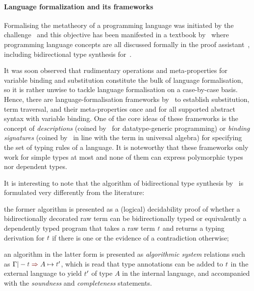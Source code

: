 \paragraph{Language formalization and its frameworks}
Formalising the metatheory of a programming language was initiated by the \PoplMark challenge~\citep{Aydemir2005} and this objective has been manifested in a textbook by~\citet{Wadler2022} where programming language concepts are all discussed formally in the proof assistant~\Agda, including bidirectional type synthesis for~\PCF.

It was soon observed that rudimentary operations and meta-properties for variable binding and substitution constitute the bulk of language formalisation, so it is rather unwise to tackle language formalisation on a case-by-case basis.
Hence, there are language-formalisation frameworks by~\citet{Ahrens2018,Fiore2022,Gheri2020,Ahrens2022,Allais2021} to establish substitution, term traversal, and their meta-properties once and for all supported abstract syntax with variable binding.
One of the core ideas of these frameworks is the concept of \emph{descriptions} (coined by~\citet{Chapman2010} for datatype-generic programming) or \emph{binding signatures} (coined by~\citet{Aczel1978} in line with the term in universal algebra) for specifying the set of typing rules of a language.
It is noteworthy that these frameworks only work for simple types at most and none of them can express polymorphic types nor dependent types.

\begin{remark}\label{re:type-synthesis-as-decidability-proof}
It is interesting to note that the algorithm of bidirectional type synthesis by~\citeauthor{Wadler2022} is formulated very differently from the literature:
\begin{enumerate*}
  \item the former algorithm is presented as a (logical) decidability proof of whether a bidirectionally decorated raw term can be bidirectionally typed or equivalently a dependently typed program that takes a raw term $\isTerm{t}$ and returns a typing derivation for $\isTerm{t}$ if there is one or the evidence of a contradiction otherwise;

  \item an algorithm in the latter form is presented as \emph{algorithmic system} relations such as $\Gamma |- \isTerm{t} \syn A \mapsto \isTerm{t}'$, which is read that type annotations can be added to $\isTerm{t}$ in the external language to yield $\isTerm{t}'$ of type $A$ in the internal language, and accompanied with the \emph{soundness} and \emph{completeness} statements.
\end{enumerate*}
\end{remark}



